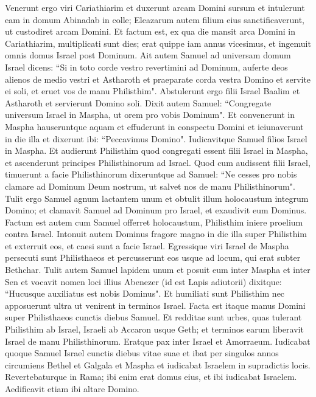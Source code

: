 \begin{biblechapter}  
\verse Venerunt ergo viri Cariathiarim et duxerunt arcam Domini sursum et intulerunt eam in domum Abinadab in colle; Eleazarum autem filium eius sanctificaverunt, ut custodiret arcam Domini. 
\verse Et factum est, ex qua die mansit arca Domini in Cariathiarim, multiplicati sunt dies; erat quippe iam annus vicesimus, et ingemuit omnis domus Israel post Dominum. 
\verse Ait autem Samuel ad universam domum Israel dicens: “Si in toto corde vestro revertimini ad Dominum, auferte deos alienos de medio vestri et Astharoth et praeparate corda vestra Domino et servite ei soli, et eruet vos de manu Philisthim". 
\verse Abstulerunt ergo filii Israel Baalim et Astharoth et servierunt Domino soli. 
\verse Dixit autem Samuel: “Congregate universum Israel in Maspha, ut orem pro vobis Dominum". 
\verse Et convenerunt in Maspha hauseruntque aquam et effuderunt in conspectu Domini et ieiunaverunt in die illa et dixerunt ibi: “Peccavimus Domino". Iudicavitque Samuel filios Israel in Maspha. 
\verse Et audierunt Philisthim quod congregati essent filii Israel in Maspha, et ascenderunt principes Philisthinorum ad Israel. Quod cum audissent filii Israel, timuerunt a facie Philisthinorum 
\verse dixeruntque ad Samuel: “Ne cesses pro nobis clamare ad Dominum Deum nostrum, ut salvet nos de manu Philisthinorum". 
\verse Tulit ergo Samuel agnum lactantem unum et obtulit illum holocaustum integrum Domino; et clamavit Samuel ad Dominum pro Israel, et exaudivit eum Dominus. 
\verse Factum est autem cum Samuel offerret holocaustum, Philisthim iniere proelium contra Israel. Intonuit autem Dominus fragore magno in die illa super Philisthim et exterruit eos, et caesi sunt a facie Israel. 
\verse Egressique viri Israel de Maspha persecuti sunt Philisthaeos et percusserunt eos usque ad locum, qui erat subter Bethchar. 
\verse Tulit autem Samuel lapidem unum et posuit eum inter Maspha et inter Sen et vocavit nomen loci illius Abenezer (id est Lapis adiutorii) dixitque: “Hucusque auxiliatus est nobis Dominus". 
\verse Et humiliati sunt Philisthim nec apposuerunt ultra ut venirent in terminos Israel. Facta est itaque manus Domini super Philisthaeos cunctis diebus Samuel. 
\verse Et redditae sunt urbes, quas tulerant Philisthim ab Israel, Israeli ab Accaron usque Geth; et terminos earum liberavit Israel de manu Philisthinorum. Eratque pax inter Israel et Amorraeum. 
\verse Iudicabat quoque Samuel Israel cunctis diebus vitae suae 
\verse et ibat per singulos annos circumiens Bethel et Galgala et Maspha et iudicabat Israelem in supradictis locis. Revertebaturque in Rama; ibi enim erat domus eius, et ibi iudicabat Israelem. Aedificavit etiam ibi altare Domino. 
\end{biblechapter}

